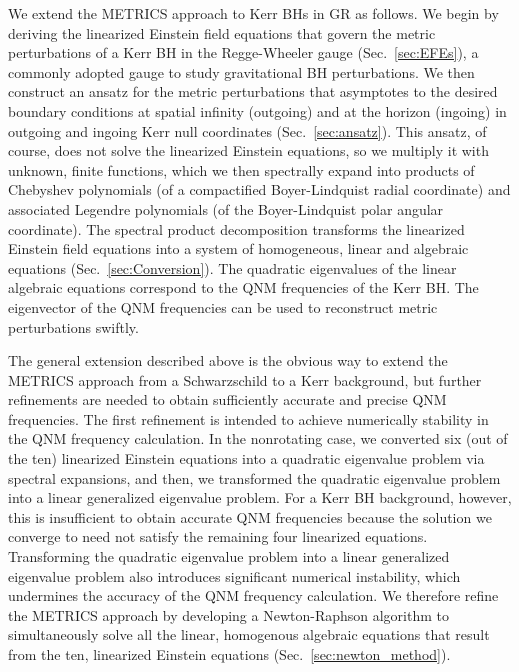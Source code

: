 \documentclass[aps,prx,amsmath,floats,floatfix,twocolumn,
  superscriptaddress,nofootinbib,showpacs]{revtex4-1}
\begin{document}
We extend the METRICS approach to Kerr BHs in GR as follows.
We begin by deriving the linearized Einstein field equations that govern the metric perturbations of a Kerr BH in the Regge-Wheeler gauge (Sec.~\ref{sec:EFEs}), a commonly adopted gauge to study gravitational BH perturbations. 
We then construct an ansatz for the metric perturbations that asymptotes to the desired boundary conditions at spatial infinity (outgoing) and at the horizon (ingoing) in outgoing and ingoing Kerr null coordinates (Sec.~\ref{sec:ansatz}).
This ansatz, of course, does not solve the linearized Einstein equations, so we multiply it with unknown, finite functions, which we then spectrally expand into products of Chebyshev polynomials (of a compactified Boyer-Lindquist radial coordinate) and associated Legendre polynomials (of the Boyer-Lindquist polar angular coordinate).
The spectral product decomposition transforms the linearized Einstein field equations into a system of homogeneous, linear and algebraic equations (Sec.~\ref{sec:Conversion}). 
The quadratic eigenvalues of the linear algebraic equations correspond to the QNM frequencies of the Kerr BH.
The eigenvector of the QNM frequencies can be used to reconstruct metric perturbations swiftly. 

The general extension described above is the obvious way to extend the METRICS approach from a Schwarzschild to a Kerr background, but further refinements are needed to obtain sufficiently accurate and precise QNM frequencies. 
The first refinement is intended to achieve numerically stability in the QNM frequency calculation. 
In the nonrotating case, we converted six (out of the ten) linearized Einstein equations into a quadratic eigenvalue problem via spectral expansions, and then, we transformed the quadratic eigenvalue problem into a linear generalized eigenvalue problem. 
For a Kerr BH background, however, this is insufficient to obtain accurate QNM frequencies because the solution we converge to need not satisfy the remaining four linearized equations. 
Transforming the quadratic eigenvalue problem into a linear generalized eigenvalue problem also introduces significant numerical instability, which undermines the accuracy of the QNM frequency calculation. 
We therefore refine the METRICS approach by developing a Newton-Raphson algorithm to simultaneously solve all the linear, homogenous algebraic equations that result from the ten, linearized Einstein equations (Sec.~\ref{sec:newton_method}). 
\end{document}
